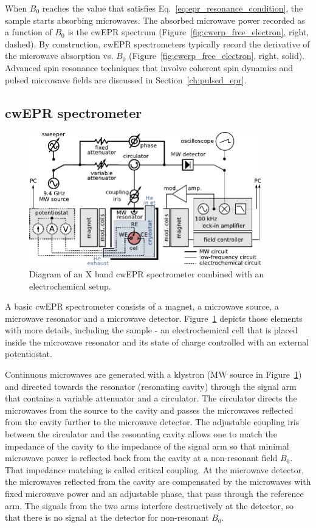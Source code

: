 \par
When $B_0$ reaches the value that satisfies Eq.~\ref{eq:epr_resonance_condition}, the sample starts absorbing microwaves. The absorbed microwave power recorded as a function of $B_0$ is the cwEPR spectrum (Figure~\ref{fig:cwerp_free_electron}, right, dashed). By construction, cwEPR spectrometers typically record the derivative of the microwave absorption vs. $B_0$ (Figure~\ref{fig:cwerp_free_electron}, right, solid). Advanced spin resonance techniques that involve coherent spin dynamics and pulsed microwave fields are discussed in Section~\ref{ch:pulsed_epr}.

\subsection{cwEPR spectrometer}
\begin{figure}[h]
\center
	\includegraphics[width=0.9\textwidth]{./operando_epr/figures/cwEPR_spectrometer_diagram.pdf}
	\caption{Diagram of an X band cwEPR spectrometer combined with an electrochemical setup.}
	\label{fig:cwerp_spectrometer}
\end{figure}

A basic cwEPR spectrometer consists of a magnet, a microwave source, a microwave resonator and a microwave detector. Figure~\ref{fig:cwerp_spectrometer} depicts those elements with more details, including the sample - an electrochemical cell that is placed inside the microwave resonator and its state of charge controlled with an external potentiostat.

\par
Continuous microwaves are generated with a klystron (MW source in Figure~\ref{fig:cwerp_spectrometer}) and directed towards the resonator (resonating cavity) through the signal arm that contains a variable attenuator and a circulator. The circulator directs the microwaves from the source to the cavity and passes the microwaves reflected from the cavity further to the microwave detector. The adjustable coupling iris between the circulator and the resonating cavity allows one to match the impedance of the cavity to the impedance of the signal arm so that minimal microwave power is reflected back from the cavity at a non-resonant field $B_0$. That impedance matching is called critical coupling. At the microwave detector, the microwaves reflected from the cavity are compensated by the microwaves with fixed microwave power and an adjustable phase, that pass through the reference arm. The signals from the two arms interfere destructively at the detector, so that there is no signal at the detector for non-resonant $B_0$.

